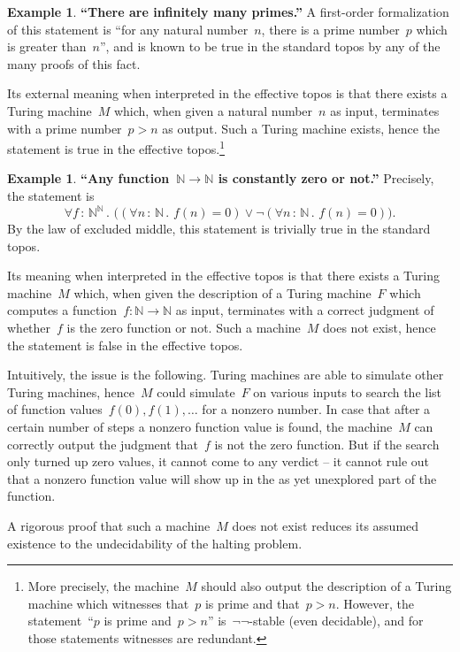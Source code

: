 \documentclass[oneside,reqno]{amsart}
\theoremstyle{definition}
\newtheorem{ex}[defn]{Example}
\theoremstyle{plain}
\theoremstyle{remark}
\newcommand{\NN}{\mathbb{N}}
\renewcommand{\_}{\mathpunct{.}\,}
\newcommand{\effective}{ef{}fective\xspace}
\newcommand{\?}{\,{:}\,}
\begin{document}
\begin{ex}\textbf{``There are infinitely many primes.''} A first-order formalization
of this statement is ``for any natural number~$n$, there is a prime
number~$p$ which is greater than~$n$'', and is known to be true in the standard
topos by any of the many proofs of this fact.

Its external meaning when interpreted in the \effective topos is that there exists
a Turing machine~$M$ which, when given a natural number~$n$ as input, terminates with a
prime number~$p > n$ as output. Such a Turing machine exists, hence the
statement is true in the \effective topos.\footnote{More precisely, the
machine~$M$ should also output the description of a Turing machine which
witnesses that~$p$ is prime and that~$p > n$. However, the statement~``$p$ is prime and~$p > n$''
is~$\neg\neg$-stable (even decidable), and for those statements witnesses are
redundant.}
\end{ex}

\begin{ex}\textbf{``Any function~$\NN \to \NN$ is constantly zero or not.''} Precisely,
the statement is
\[ \forall f \? \NN^\NN\_
  \bigl((\forall n \? \NN\_ f(n) = 0) \vee
  \neg
  (\forall n \? \NN\_ f(n) = 0)\bigr). \]
By the law of excluded middle, this statement is trivially true in the standard
topos.

Its meaning when interpreted in the \effective topos is that there exists a
Turing machine~$M$ which, when given the description of a Turing machine~$F$ which
computes a function~$f : \NN \to \NN$ as input, terminates with a correct
judgment of whether~$f$ is the zero function or not. Such a machine~$M$ does
not exist, hence the statement is false in the \effective topos.

Intuitively, the issue
is the following. Turing machines are able to simulate other Turing machines,
hence~$M$ could simulate~$F$ on various inputs to search the list of
function values~$f(0), f(1), \ldots$ for a nonzero number. In case that after
a certain number of steps a nonzero function value is found, the machine~$M$
can correctly output the judgment that~$f$ is not the zero function. But if the
search only turned up zero values, it cannot come to any verdict -- it cannot
rule out that a nonzero function value will show up in the as yet unexplored
part of the function.

A rigorous proof that such a machine~$M$ does not exist reduces its assumed
existence to the undecidability of the halting problem.
\end{ex}
\end{document}
